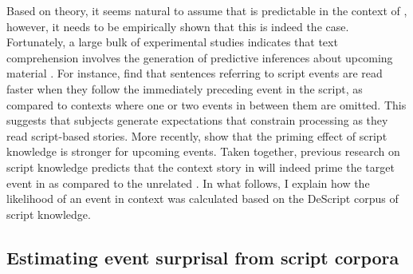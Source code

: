 Based on  theory, it seems natural to assume that \Last[e] is predictable in  the context of \Last[a-d], however, it needs to be empirically shown that this is indeed the case. Fortunately, a large bulk of experimental studies indicates that text comprehension involves the generation of predictive inferences about upcoming material \citep[see e.g.][]{bower.etal1979, mckoon.ratcliff1986, vandenbroek1994, vandermeer.etal2002, nuthmann.vandermeer2005,camblin.etal2007, otten.vanberkum2007, hare.etal2009, bicknell.etal2010, matsuki.etal2011,metusalem.etal2012, delogu.etal2018}. For instance, \citet{bower.etal1979} find that sentences referring to script events are read faster when they follow the immediately preceding event in the script, as compared to contexts where one or two events in between them are omitted. This suggests that subjects generate expectations that constrain processing as they read script-based stories. More recently, \citet{vandermeer.etal2002} show that the priming effect of script knowledge is stronger for upcoming events. Taken together, previous research on script knowledge predicts that the context story in \Last[a-d] will indeed prime the target event in \Last[e] as compared to the unrelated \Last[f]. In what follows, I explain how the likelihood of an event in context was calculated based on the DeScript corpus of script knowledge.

\subsection{Estimating event surprisal from script corpora}
\label{sec:infotheory-script-event-chains}

